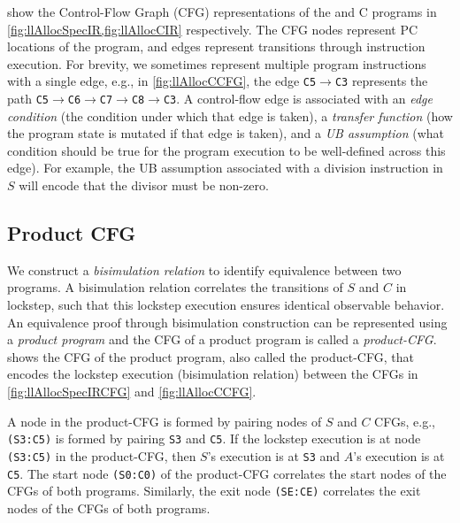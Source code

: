  show the Control-Flow Graph (CFG) representations
of the \SpecL{} and C programs in \cref{fig:llAllocSpecIR,fig:llAllocCIR} respectively.
The CFG nodes represent PC locations of the program, and edges represent
transitions through instruction execution. For brevity, we sometimes represent
multiple program instructions with a single edge, e.g., in \cref{fig:llAllocCCFG}, the edge {\small \tt C5$\rightarrow$C3}
represents the path {\small \tt C5$\rightarrow$C6$\rightarrow$C7$\rightarrow$C8$\rightarrow$C3}. A control-flow edge is associated
with an {\em edge condition} (the condition under which that edge is taken),
a {\em transfer function} (how the program state is mutated if that edge is taken),
and a {\em UB assumption} (what condition should be true for the program
execution to be
well-defined across this edge). For example, the UB assumption associated with a division
instruction in $S$ will encode that the divisor must be non-zero.

\subsection{Product CFG}
\label{sec:productCFG}
We construct
a {\em bisimulation relation} to identify
equivalence between two programs. 
A bisimulation relation correlates
the transitions of $S$ and $C$ in lockstep, such that this
lockstep execution ensures
identical observable behavior.
An equivalence proof through bisimulation construction
can be represented using a
{\em product program} \cite{covac} and the CFG of a product program is called a {\em product-CFG}.
 shows the CFG of the product program, also called
the product-CFG,
that encodes the lockstep execution (bisimulation relation) between the
CFGs in \cref{fig:llAllocSpecIRCFG} and \cref{fig:llAllocCCFG}. 



A node in the product-CFG is formed by pairing nodes
of $S$ and $C$ CFGs, e.g., {\tt (S3:C5)} is formed by
pairing {\tt S3} and {\tt C5}.
If the lockstep
execution is at node {\tt (S3:C5)} in the product-CFG,
then $S$'s execution is at {\tt S3} and $A$'s execution
is at {\tt C5}.
The start node {\tt (S0:C0)} of the product-CFG
correlates the start nodes of the CFGs of both programs.
Similarly, the exit node {\tt (SE:CE)}
correlates the exit nodes of the CFGs of both programs.

